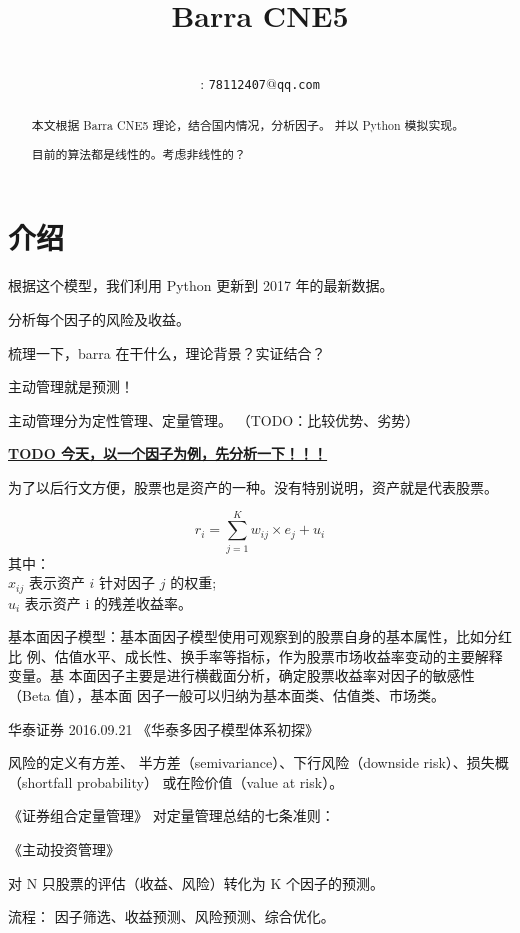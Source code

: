 \documentclass[a4paper, 11pt, UTF8]{report}
\begin{document}
\title{Barra CNE5}
\author{
         \\
        : \tt{78112407$@$qq.com}\\
        \vspace{0.5\textheight} \phantom{phan}}

\maketitle
\newpage
\pagestyle{empty}

\begin{abstract}
        本文根据 Barra CNE5 理论，结合国内情况，分析因子。
        并以 Python 模拟实现。

	目前的算法都是线性的。考虑非线性的？
\end{abstract}



\tableofcontents
\newpage

\pagestyle{plain}

\chapter{介绍}


根据这个模型，我们利用 Python 更新到 2017 年的最新数据。

分析每个因子的风险及收益。

梳理一下，barra 在干什么，理论背景？实证结合？

主动管理就是预测！

主动管理分为定性管理、定量管理。
（TODO：比较优势、劣势）

{\bf \underline{TODO 今天，以一个因子为例，先分析一下！！！}}

为了以后行文方便，股票也是资产的一种。没有特别说明，资产就是代表股票。

$$
r_{i} = \sum^{K}_{j=1} w_{i j} \times e_j + u_i
$$
其中：\\
$ x_{ij} $ 表示资产 $i$ 针对因子 $j$ 的权重;\\
$u_i$ 表示资产 i 的残差收益率。

基本面因子模型：基本面因子模型使用可观察到的股票自身的基本属性，比如分红比 例、估值水平、成长性、换手率等指标，作为股票市场收益率变动的主要解释变量。基 本面因子主要是进行横截面分析，确定股票收益率对因子的敏感性（Beta 值），基本面 因子一般可以归纳为基本面类、估值类、市场类。

华泰证券 2016.09.21 《华泰多因子模型体系初探》

风险的定义有方差、 半方差（semivariance）、下行风险（downside risk）、损失概 （shortfall probability）
或在险价值（value at risk）。


《证券组合定量管理》
对定量管理总结的七条准则：


《主动投资管理》

对 N 只股票的评估（收益、风险）转化为 K 个因子的预测。

流程：
因子筛选、收益预测、风险预测、综合优化。
\end{document}
